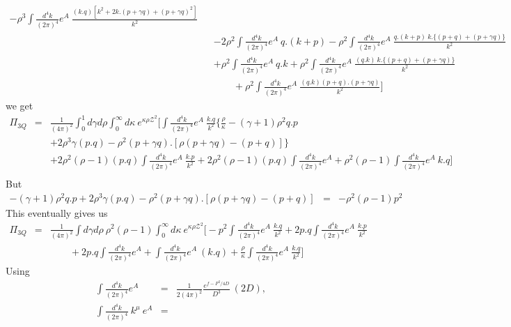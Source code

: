 \documentclass[twoside]{article}
\begin{document}
\begin{appendix}
\begin{eqnarray}
- \rho^3 \int \frac{d^4 k}{(2 \pi)^4} e^A~ \frac{(k.q)\left[ k^2 + 2k.(p+ \gamma q) + (p+ \gamma q)^2 \right]}{k^2} \nonumber\\&&
- 2 \rho^2 \int \frac{d^4 k}{(2 \pi)^4} e^A~ q.(k+p) - \rho^2 \int \frac{d^4 k}{(2 \pi)^4} e^A~ \frac{q.(k+p)~k.\Big\{ (p+q)+ (p+\gamma q) \Big\}}{k^2} \nonumber\\&&
+ \rho^2 \int \frac{d^4 k}{(2 \pi)^4} e^A~ q.k  + \rho^2 \int \frac{d^4 k}{(2 \pi)^4} e^A~ \frac{(q.k)~k.\Big\{ (p+q)+(p+\gamma q) \Big\}}{k^2} \nonumber\\&& \qquad
+ \rho^2 \int \frac{d^4 k}{(2 \pi)^4} e^A~\frac{(q.k)(p+q).(p+\gamma q)}{k^2}
\Big]
\end{eqnarray}
we get
\begin{eqnarray}
\Pi_{3Q} &=&
\frac{1}{(4 \pi)^2}
\int_0^1 d \gamma d \rho \int_0^\infty d \kappa~ e^{\kappa \rho {\mathcal{Z}}^2} \Big[
\int \frac{d^4 k}{(2 \pi)^4} e^A~ \frac{k.q}{k^2} \Big\{
\frac{\rho}{\kappa} - (\gamma + 1)\rho^2 q.p \nonumber\\&&
+ 2 \rho^3 \gamma (p.q) - \rho^2 (p+ \gamma q).\left[ \rho(p+ \gamma q) - (p+q)  \right]
\Big\} \nonumber\\&&
+ 2 \rho^2 (\rho -1)(p.q)\int \frac{d^4 k}{(2 \pi)^4} e^A~\frac{k.p}{k^2} + 2 \rho^2(\rho -1)(p.q)\int \frac{d^4 k}{(2 \pi)^4} e^A + \rho^2(\rho -1) \int \frac{d^4 k}{(2 \pi)^4} e^A~ k.q
\Big] \nonumber\\
\end{eqnarray}
But
\begin{eqnarray}
- (\gamma + 1)\rho^2 q.p + 2 \rho^3 \gamma (p.q) - \rho^2 (p+ \gamma q).\left[ \rho(p+ \gamma q) - (p+q)  \right]
&=& - \rho^2 (\rho - 1) p^2
\end{eqnarray}
This eventually gives us
\begin{eqnarray}
\label{Pi3c}
\Pi_{3Q}
&=&
\frac{1}{(4 \pi)^2} \int d \gamma d \rho~ \rho^2 (\rho -1) \int_0^\infty d \kappa~ e^{\kappa \rho {\mathcal{Z}}^2} \Big[
-p^2 \int \frac{d^4 k}{(2 \pi)^4} e^A~\frac{k.q}{k^2} + 2p.q \int \frac{d^4 k}{(2 \pi)^4} e^A~\frac{k.p}{k^2} \nonumber\\&& \qquad
+2p.q \int \frac{d^4 k}{(2 \pi)^4} e^A + \int \frac{d^4 k}{(2 \pi)^4} e^A~(k.q) + \frac{\rho}{\kappa} \int \frac{d^4 k}{(2 \pi)^4} e^A~\frac{k.q}{k^2}
\Big]
\end{eqnarray}
Using 
\begin{eqnarray}
\int \frac{d^4 k}{(2\pi)^4} e^A &=&\frac{1}{2(4 \pi)^2} \frac{e^{f - F^2/4D}}{D^3}~(2D),\\
\int \frac{d^4 k}{(2\pi)^4} ~k^\mu~ e^A &=& 

\end{eqnarray}
\end{appendix}
\end{document}
